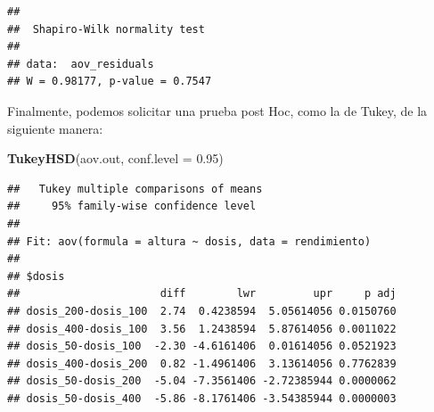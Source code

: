 \documentclass[
]{book}
\newenvironment{Shaded}{\begin{snugshade}}{\end{snugshade}}
\newcommand{\AttributeTok}[1]{\textcolor[rgb]{0.13,0.29,0.53}{#1}}
\newcommand{\FloatTok}[1]{\textcolor[rgb]{0.00,0.00,0.81}{#1}}
\newcommand{\FunctionTok}[1]{\textcolor[rgb]{0.13,0.29,0.53}{\textbf{#1}}}
\newcommand{\NormalTok}[1]{#1}
\begin{document}
\begin{verbatim}
## 
##  Shapiro-Wilk normality test
## 
## data:  aov_residuals
## W = 0.98177, p-value = 0.7547
\end{verbatim}

Finalmente, podemos solicitar una prueba post Hoc, como la de Tukey, de la siguiente manera:

\begin{Shaded}
\begin{Highlighting}[]
\FunctionTok{TukeyHSD}\NormalTok{(aov.out, }\AttributeTok{conf.level =} \FloatTok{0.95}\NormalTok{)}
\end{Highlighting}
\end{Shaded}

\begin{verbatim}
##   Tukey multiple comparisons of means
##     95% family-wise confidence level
## 
## Fit: aov(formula = altura ~ dosis, data = rendimiento)
## 
## $dosis
##                      diff        lwr         upr     p adj
## dosis_200-dosis_100  2.74  0.4238594  5.05614056 0.0150760
## dosis_400-dosis_100  3.56  1.2438594  5.87614056 0.0011022
## dosis_50-dosis_100  -2.30 -4.6161406  0.01614056 0.0521923
## dosis_400-dosis_200  0.82 -1.4961406  3.13614056 0.7762839
## dosis_50-dosis_200  -5.04 -7.3561406 -2.72385944 0.0000062
## dosis_50-dosis_400  -5.86 -8.1761406 -3.54385944 0.0000003
\end{verbatim}

  
\end{document}
